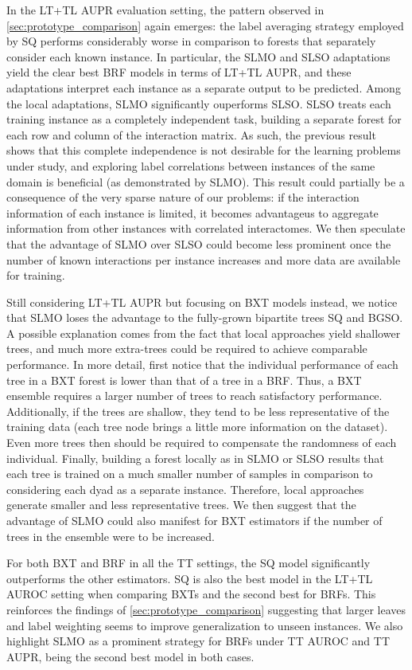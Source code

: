 In the LT+TL AUPR evaluation setting, the pattern observed in \autoref{sec:prototype_comparison} again emerges: the label averaging strategy employed by SQ performs considerably worse in comparison to forests that separately consider each known instance. In particular, the SLMO and SLSO adaptations yield the clear best BRF models in terms of LT+TL AUPR, and these adaptations interpret each instance as a separate output to be predicted. Among the local adaptations, SLMO significantly ouperforms SLSO. SLSO treats each training instance as a completely independent task, building a separate forest for each row and column of the interaction matrix. As such, the previous result shows that this complete independence is not desirable for the learning problems under study, and exploring label correlations between instances of the same domain is beneficial (as demonstrated by SLMO). This result could partially be a consequence of the very sparse nature of our problems: if the interaction information of each instance is limited, it becomes advantageus to aggregate information from other instances with correlated interactomes. We then speculate that the advantage of SLMO over SLSO could become less prominent once the number of known interactions per instance increases and more data are available for training.

Still considering LT+TL AUPR but focusing on BXT models instead, we notice that SLMO loses the advantage to the fully-grown bipartite trees SQ and BGSO. A possible explanation comes from the fact that local approaches yield shallower trees, and much more extra-trees could be required to achieve comparable performance. In more detail, first notice that the individual performance of each tree in a BXT forest is lower than that of a tree in a BRF. Thus, a BXT ensemble requires a larger number of trees to reach satisfactory performance. Additionally, if the trees are shallow, they tend to be less representative of the training data (each tree node brings a little more information on the dataset).
Even more trees then should be required to compensate the randomness of each individual. Finally, building a forest locally as in SLMO or SLSO results that each tree is trained on a much smaller number of samples in comparison to considering each dyad as a separate instance. Therefore, local approaches generate smaller and less representative trees. We then suggest that the advantage of SLMO could also manifest for BXT estimators if the number of trees in the ensemble were to be increased.

For both BXT and BRF in all the TT settings, the SQ model significantly outperforms the other estimators. SQ is also the best model in the LT+TL AUROC setting when comparing BXTs and the second best for BRFs. This reinforces the findings of \autoref{sec:prototype_comparison} suggesting that larger leaves and label weighting seems to improve generalization to unseen instances.
%
We also highlight SLMO as a prominent strategy for BRFs under TT AUROC and TT AUPR, being the second best model in both cases.

